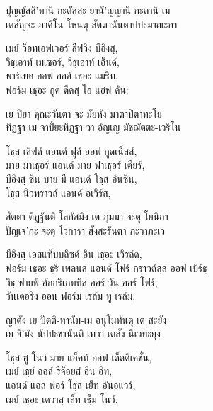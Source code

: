 
\begin{leader}
\end{leader}

ปุญญัสสิ’ทานิ กะตัสสะ ยานั’ญญานิ กะตานิ เม\\
เตสัญจะ ภาคิโน โหนตุ สัตตานันตาปปะมาณะกา\\

\begin{english}
เมย์ ว็อทเอฟเวอร์ ลีฟวิง บีอิงสฺ,\\
วิธฺเอาท์ เมเซอร์, วิธฺเอาท์ เอ็นด์,\\
พาร์เทค ออฟ ออล์ เธฺอะ แมริท,\\
ฟอร์ม เธฺอะ กูด ดีดสฺ ไอ แฮฟ ดัน:\\
\end{english}

เย ปิยา คุณะวันตา จะ มัยหัง มาตาปิตาทะโย\\
ทิฏฐา เม จาป๎ยะทิฏฐา วา อัญเญ มัชฌัตตะ-เวริโน\\

\begin{english}
โธฺส เลิฟด์ แอนด์ ฟูล์ ออฟ กูดเน็สส์,\\
มาย มาเธฺอร์ แอนด์ มาย ฟาเธฺอร์ เดียร์,\\
บีอิงสฺ ซีน บาย มี แอนด์ โธฺส อันซีน,\\
โธฺส นิวทราวล์ แอนด์ อเวิร์ส,\\
\end{english}

สัตตา ติฏฐันติ โลกัสมิง เต-ภุมมา จะตุ-โยนิกา\\
ปัญเจ’กะ-จะตุ-โวการา สังสะรันตา ภะวาภะเว\\

\begin{english}
บีอิงสฺ เอสแท็บบลิซด์ อิน เธฺอะ เวิรล์ด,\\
ฟอร์ม เธฺอะ ธฺรี เพลนสฺ แอนด์ โฟร์ กราวด์สฺส ออฟ เบิร์ธฺ\\
วิธฺ ฟายฟ์ อักกริเกททิส ออร์ วัน ออร์ โฟร์,\\
วันเดอริง ออน ฟอร์ม เรล์ม ทู เรล์ม,\\
\end{english}

ญาตัง เย ปัตติ-ทานัม-เม อนุโมทันตุ เต สะยัง\\
เย จิ’มัง นัปปะชานันติ เทวา เตสัง นิเวทะยุง\\
\clearpage

\begin{english}
โธฺส ฮู โนว์ มาย แอ็คท์ ออฟ เด็ดดิเคชั่น,\\
เมย์ เธฺย์ ออล์ รีจ็อยส์ อิน อิท,\\
แอนด์ แอส ฟอร์ โธฺส เย็ท อันอแวร์,\\
เมย์ เธฺอะ เดวาสฺ  เล็ท เธฺ็ม โนว์.\\
\end{english}

